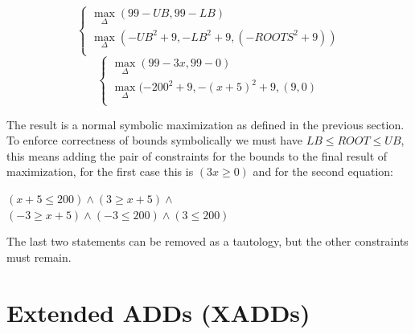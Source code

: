 \documentclass[letterpaper]{article}
\renewcommand{\-}{\text{-}}
\begin{document}
\begin{equation*}
  \begin{cases}
\max_{\Delta} ( 99-UB , 99 - LB)  \\ 
\max_{\Delta} (- UB^{2} +9 , - LB^{2}+9, (- ROOTS^{2}+9))\\ 
  \end{cases}
\end{equation*}
\begin{equation*}
\begin{cases}
\max_{\Delta} ( 99- 3x , 99 - 0)  \\ 
\max_{\Delta} (-200^{2} +9 , - (x+5)^{2}+9, (9,0)\\ 
  \end{cases}
\end{equation*}

The result is a normal symbolic maximization as defined in the previous section. 
To enforce correctness of bounds symbolically we must have $LB \leq ROOT \leq UB$, this means adding the pair of constraints for the bounds to the final result of maximization, for the first case this is $(3x \geq 0) $ and for the second equation: \\
\begin{center}
$(x+5 \leq 200) \wedge (3 \geq x+5)  \wedge $
\\ $(-3 \geq x+5) \wedge (-3 \leq 200) \wedge (3\leq 200)$
\end{center}

The last two statements can be removed as a tautology, but the other constraints must remain.


\section{Extended ADDs (XADDs)}
\end{document}
